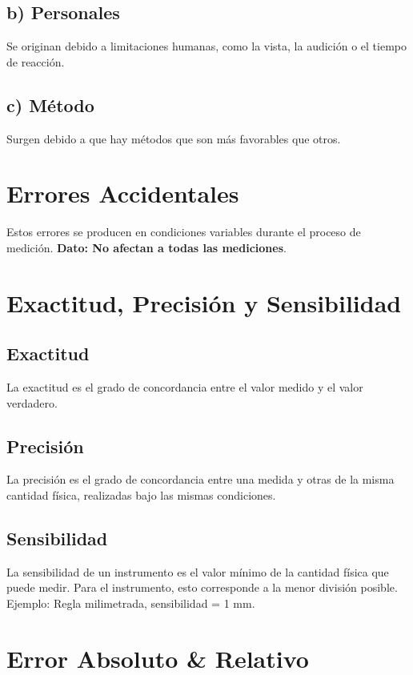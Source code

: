 \subsection{b) Personales}
Se originan debido a limitaciones humanas, como la vista, la audición o el tiempo de reacción.

\subsection{c) Método}
Surgen debido a que hay métodos que son más favorables que otros.

\section{Errores Accidentales}

Estos errores se producen en condiciones variables durante el proceso de medición.  
\textbf{ Dato: No afectan a todas las mediciones}.


\section{Exactitud, Precisión y Sensibilidad}

\subsection{Exactitud}
La exactitud es el grado de concordancia entre el valor medido y el valor verdadero.

\subsection{Precisión}
La precisión es el grado de concordancia entre una medida y otras de la misma cantidad física, realizadas bajo las mismas condiciones.

\subsection{Sensibilidad}
La sensibilidad de un instrumento es el valor mínimo de la cantidad física que puede medir. Para el instrumento, esto corresponde a la menor división posible.  
Ejemplo: Regla milimetrada, sensibilidad = 1 mm.

\newpage
\section{Error Absoluto \& Relativo}

